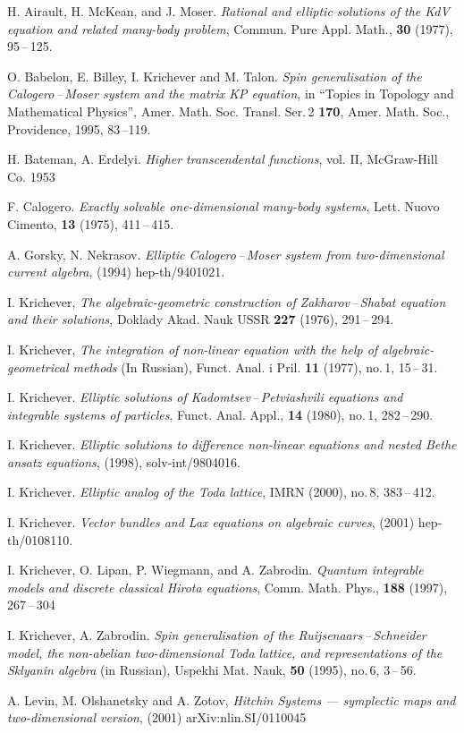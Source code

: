\documentclass[a4paper,11pt]{article}
\theoremstyle{plain}
\theoremstyle{remark}
\begin{document}
\begin{thebibliography}{9}

 H. Airault, H. McKean, and J. Moser.
\emph{Rational and elliptic solutions of the KdV equation and
related many-body problem},
Commun. Pure Appl. Math., {\bf 30} (1977), 95\,--\,125.

 O. Babelon, E. Billey, I. Krichever and M. Talon.
\emph{Spin generalisation of the Calogero\,--\,Moser system and the
matrix KP equation}, in ``Topics in Topology and Mathematical Physics'',
Amer. Math. Soc. Transl. Ser.\,2 {\bfseries 170},
Amer. Math. Soc., Providence, 1995, 83\,--119.

 H. Bateman, A. Erdelyi.
\emph{Higher transcendental functions},
vol. II, McGraw-Hill Co. 1953

 F. Calogero.
\emph{Exactly solvable one-dimensional many-body systems},
Lett. Nuovo Cimento, {\bf 13} (1975), 411\,--\,415.

 A. Gorsky, N. Nekrasov.
\emph{Elliptic Calogero\,--\,Moser system from two-dimensional
current algebra}, (1994) hep-th/9401021.

 I. Krichever,
\emph{The algebraic-geometric construction of Zakharov\,--\,Shabat
equation and their solutions},
Doklady Akad. Nauk USSR {\bf 227} (1976), 291\,--\,294.

 I. Krichever,
\emph{The integration of non-linear equation with the help
of algebraic-geometrical methods} (In Russian),
Funct. Anal. i Pril. {\bfseries 11} (1977), no.\,1, 15\,--\,31.

 I. Krichever.
\emph{Elliptic solutions of Kadomtsev\,--\,Petviashvili equations and
integrable systems of particles},
Funct. Anal. Appl., {\bf 14} (1980), no.\,1, 282\,--\,290.

 I. Krichever.
\emph{Elliptic solutions to difference non-linear equations and
nested Bethe ansatz equations}, (1998), solv-int/9804016.

 I. Krichever.
\emph{Elliptic analog of the Toda lattice},
IMRN (2000), no.\,8, 383\,--\,412.

 I. Krichever.
\emph{Vector bundles and Lax equations on algebraic curves},
(2001) hep-th/0108110.

 I. Krichever, O. Lipan, P. Wiegmann, and A. Zabrodin.
\emph{Quantum integrable models and discrete classical Hirota equations},
Comm. Math. Phys., {\bfseries 188} (1997), 267\,--\,304

 I. Krichever, A. Zabrodin.
\emph{Spin generalisation of the Ruijsenaars\,--\,Schneider model,
the non-abelian two-dimensional Toda lattice, and representations of
the Sklyanin algebra} (in Russian),
Uspekhi Mat. Nauk, {\bfseries 50} (1995), no.\,6, 3\,--\,56.

 A. Levin, M. Olshanetsky and A. Zotov,
\emph{Hitchin Systems --- symplectic maps and two-dimensional version},
(2001) arXiv:nlin.SI/0110045

\end{thebibliography}
\end{document}
